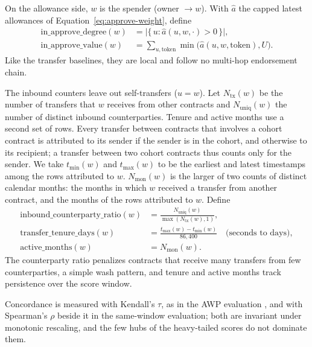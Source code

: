 
On the allowance side, $w$ is the spender (owner $\to w$). With $\hat a$ the capped latest allowances of Equation~\eqref{eq:approve-weight}, define
\begin{align}
\mathrm{in\_approve\_degree}(w)
&=
\bigl|\{\,u : \hat a(u,w,\cdot)>0\,\}\bigr|,
\label{eq:in-approve-degree}\\
\mathrm{in\_approve\_value}(w)
&=
\sum_{u,\mathrm{token}} \min\bigl(\hat a(u,w,\mathrm{token}),U\bigr).
\label{eq:in-approve-value}
\end{align}
Like the transfer baselines, they are local and follow no multi-hop endorsement chain.


The inbound counters leave out self-transfers ($u=w$). Let $N_{\mathrm{tx}}(w)$ be the number of transfers that $w$ receives from other contracts and $N_{\mathrm{uniq}}(w)$ the number of distinct inbound counterparties. Tenure and active months use a second set of rows. Every transfer between contracts that involves a cohort contract is attributed to its sender if the sender is in the cohort, and otherwise to its recipient; a transfer between two cohort contracts thus counts only for the sender. We take $t_{\min}(w)$ and $t_{\max}(w)$ to be the earliest and latest timestamps among the rows attributed to $w$. $N_{\mathrm{mon}}(w)$ is the larger of two counts of distinct calendar months: the months in which $w$ received a transfer from another contract, and the months of the rows attributed to $w$. Define
\begin{align}
\mathrm{inbound\_counterparty\_ratio}(w)
&=
\frac{N_{\mathrm{uniq}}(w)}{\max(N_{\mathrm{tx}}(w),1)},
\label{eq:counterparty-ratio}\\
\mathrm{transfer\_tenure\_days}(w)
&=
\frac{t_{\max}(w)-t_{\min}(w)}{86{,}400}\quad\text{(seconds to days)},
\label{eq:tenure}\\
\mathrm{active\_months}(w)
&=
N_{\mathrm{mon}}(w).
\label{eq:active-months}
\end{align}
The counterparty ratio penalizes contracts that receive many transfers from few counterparties, a simple wash pattern, and tenure and active months track persistence over the score window.


Concordance is measured with Kendall's $\tau$, as in the AWP evaluation \parencite{do2023awp}, and with Spearman's $\rho$ beside it in the same-window evaluation; both are invariant under monotonic rescaling, and the few hubs of the heavy-tailed scores do not dominate them.

